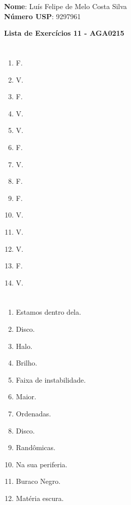 \documentclass[12pt,letterpaper]{article}
\begin{document}
	
	\large \textbf{Nome}: Luís Felipe de Melo Costa Silva \\
	\textbf{Número USP}: 9297961 
    
	\begin{center}
		\LARGE \bf
		Lista de Exercícios 11 - AGA0215
	\end{center}
	
	\part{}
	
	\begin{multicols}{7}
		\begin{enumerate}
			\item F.
			\item V.
			\item F.
			\item V.
			\item V.
			\item F.
			\item V.
			\item F.
			\item F.
			\item V.
			\item V.
			\item V.
		    \item F.
		    \item V.
		\end{enumerate}
	\end{multicols}
	
	\part{}
		\begin{multicols}{2}
			\begin{enumerate}
				\item Estamos dentro dela.
				\item Disco.
				\item Halo.
				\item Brilho.
				\item Faixa de instabilidade.
				\item Maior.
				\item Ordenadas.
				\item Disco.
				\item Randômicas.
				\item Na sua periferia.
				\item Buraco Negro.
				\item Matéria escura.
			\end{enumerate}
		\end{multicols}
	
\end{document}
